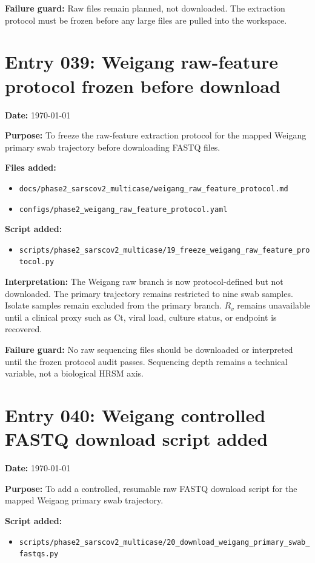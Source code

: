 \textbf{Failure guard:} Raw files remain planned, not downloaded. The extraction protocol must be frozen before any large files are pulled into the workspace.

\section*{Entry 039: Weigang raw-feature protocol frozen before download}

\textbf{Date:} \today

\textbf{Purpose:} To freeze the raw-feature extraction protocol for the mapped Weigang primary swab trajectory before downloading FASTQ files.

\textbf{Files added:}
\begin{itemize}
    \item \texttt{docs/phase2\_sarscov2\_multicase/weigang\_raw\_feature\_protocol.md}
    \item \texttt{configs/phase2\_weigang\_raw\_feature\_protocol.yaml}
\end{itemize}

\textbf{Script added:}
\begin{itemize}
    \item \texttt{scripts/phase2\_sarscov2\_multicase/19\_freeze\_weigang\_raw\_feature\_protocol.py}
\end{itemize}

\textbf{Interpretation:} The Weigang raw branch is now protocol-defined but not downloaded. The primary trajectory remains restricted to nine swab samples. Isolate samples remain excluded from the primary branch. \(R_v\) remains unavailable until a clinical proxy such as Ct, viral load, culture status, or endpoint is recovered.

\textbf{Failure guard:} No raw sequencing files should be downloaded or interpreted until the frozen protocol audit passes. Sequencing depth remains a technical variable, not a biological HRSM axis.

\section*{Entry 040: Weigang controlled FASTQ download script added}

\textbf{Date:} \today

\textbf{Purpose:} To add a controlled, resumable raw FASTQ download script for the mapped Weigang primary swab trajectory.

\textbf{Script added:}
\begin{itemize}
    \item \texttt{scripts/phase2\_sarscov2\_multicase/20\_download\_weigang\_primary\_swab\_fastqs.py}
\end{itemize}

